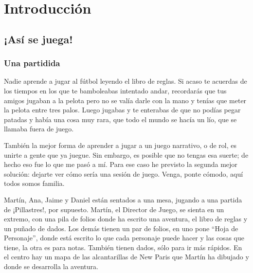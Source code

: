 \chapter{Introducción}

\section{¡Así se juega!}

\subsection{Una partidida}

Nadie aprende a jugar al fútbol leyendo el libro de reglas. Si acaso te acuerdas de los tiempos en los que te bamboleabas intentado andar, recordarás que tus amigos jugaban a la pelota pero no se valía darle con la mano y tenías que meter la pelota entre tres palos. Luego jugabas y te enterabas de que no podías pegar patadas y había una cosa muy rara, que todo el mundo se hacía un lío, que se llamaba fuera de juego.

También la mejor forma de aprender a jugar a un juego narrativo, o de rol, es unirte a gente que ya juegue. Sin embargo, es posible que no tengas esa suerte; de hecho eso fue lo que me pasó a mí. Para ese caso he previsto la segunda mejor solución: dejarte ver cómo sería una sesión de juego. Venga, ponte cómodo, aquí todos somos familia.

Martín, Ana, Jaime y Daniel están sentados a una mesa, jugando a una partida de ¡Pillastres!, por supuesto. Martín, el Director de Juego, se sienta en un extremo, con una pila de folios donde ha escrito una aventura, el libro de reglas y un puñado de dados. Los demás tienen un par de folios, en uno pone “Hoja de Personaje”, donde está escrito lo que cada personaje puede hacer y las cosas que tiene, la otra es para notas. También tienen dados, sólo para ir más rápidos. En el centro hay un mapa de las alcantarillas de New Paris que Martín ha dibujado y donde se desarrolla la aventura.

